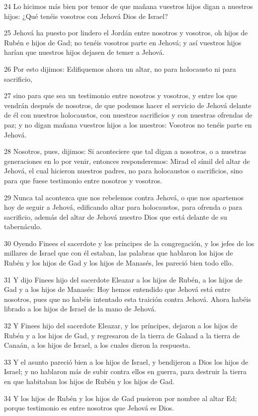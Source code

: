 \par 24 Lo hicimos más bien por temor de que mañana vuestros hijos digan a nuestros hijos: ¿Qué tenéis vosotros con Jehová Dios de Israel?
\par 25 Jehová ha puesto por lindero el Jordán entre nosotros y vosotros, oh hijos de Rubén e hijos de Gad; no tenéis vosotros parte en Jehová; y así vuestros hijos harían que nuestros hijos dejasen de temer a Jehová.
\par 26 Por esto dijimos: Edifiquemos ahora un altar, no para holocausto ni para sacrificio,
\par 27 sino para que sea un testimonio entre nosotros y vosotros, y entre los que vendrán después de nosotros, de que podemos hacer el servicio de Jehová delante de él con nuestros holocaustos, con nuestros sacrificios y con nuestras ofrendas de paz; y no digan mañana vuestros hijos a los nuestros: Vosotros no tenéis parte en Jehová.
\par 28 Nosotros, pues, dijimos: Si aconteciere que tal digan a nosotros, o a nuestras generaciones en lo por venir, entonces responderemos: Mirad el símil del altar de Jehová, el cual hicieron nuestros padres, no para holocaustos o sacrificios, sino para que fuese testimonio entre nosotros y vosotros.
\par 29 Nunca tal acontezca que nos rebelemos contra Jehová, o que nos apartemos hoy de seguir a Jehová, edificando altar para holocaustos, para ofrenda o para sacrificio, además del altar de Jehová nuestro Dios que está delante de su tabernáculo.
\par 30 Oyendo Finees el sacerdote y los príncipes de la congregación, y los jefes de los millares de Israel que con él estaban, las palabras que hablaron los hijos de Rubén y los hijos de Gad y los hijos de Manasés, les pareció bien todo ello.
\par 31 Y dijo Finees hijo del sacerdote Eleazar a los hijos de Rubén, a los hijos de Gad y a los hijos de Manasés: Hoy hemos entendido que Jehová está entre nosotros, pues que no habéis intentado esta traición contra Jehová. Ahora habéis librado a los hijos de Israel de la mano de Jehová.
\par 32 Y Finees hijo del sacerdote Eleazar, y los príncipes, dejaron a los hijos de Rubén y a los hijos de Gad, y regresaron de la tierra de Galaad a la tierra de Canaán, a los hijos de Israel, a los cuales dieron la respuesta.
\par 33 Y el asunto pareció bien a los hijos de Israel, y bendijeron a Dios los hijos de Israel; y no hablaron más de subir contra ellos en guerra, para destruir la tierra en que habitaban los hijos de Rubén y los hijos de Gad.
\par 34 Y los hijos de Rubén y los hijos de Gad pusieron por nombre al altar Ed; porque testimonio es entre nosotros que Jehová es Dios.

